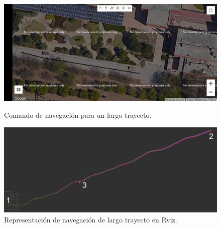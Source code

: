 \begin{figure}[htbp]
  \centering
  \begin{minipage}[b]{0.45\textwidth}
    \centering
    \includegraphics[width=\textwidth]{images/navegacion_largo_trayecto_captura.jpeg}
    \caption{Comando de navegación para un largo trayecto.}
    \label{fig:navegacion_largo_web}
  \end{minipage}
  \hfill
  \begin{minipage}[b]{0.45\textwidth}
    \centering
    \includegraphics[width=\textwidth]{images/nav_larga_2.png}
    \caption{Representación de navegación de largo trayecto en Rviz.}
    \label{fig:navegacion_largo_rviz}
  \end{minipage}
\end{figure}

